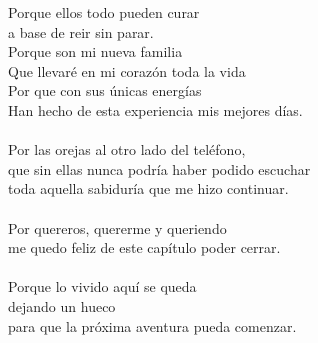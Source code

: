 \begin{flushright}
{Porque ellos todo pueden curar \\
a base de reir sin parar. \\
Porque son mi nueva familia \\
Que llevaré en mi corazón toda la vida \\
Por que con sus únicas energías \\
Han hecho de esta experiencia mis mejores días. \\
\\[0.5cm]
Por las orejas al otro lado del teléfono, \\
que sin ellas nunca podría haber podido escuchar \\
toda aquella sabiduría que me hizo continuar. \\
\\[0.5cm]
Por quereros, quererme y queriendo \\
me quedo feliz de este capítulo poder cerrar. \\
\\
Porque lo vivido aquí se queda \\
dejando un hueco \\
para que la próxima aventura pueda comenzar.}
\end{flushright}